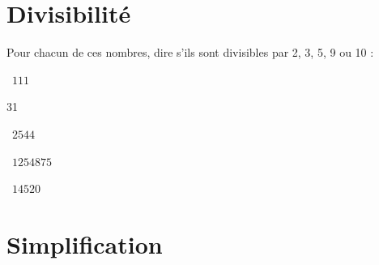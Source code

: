 	
	\section{Divisibilité}
	
	Pour chacun de ces nombres, dire s'ils sont divisibles par 2, 3, 5, 9 ou 10 :
	\begin{questions}
		
	
		\question[2]  $\num{111}$
		\fillwithdottedlines{1.5cm}
		\begin{solution}
			31
		\end{solution}	 
		
		\question[2]  $\num{2544}$
		\fillwithdottedlines{1.5cm}
		\begin{solution}
			
		\end{solution}
			
		
		\question[2]  $\num{1254875}$
		\fillwithdottedlines{1.5cm}
		\begin{solution}

		\end{solution}
		
		\question[2]  $\num{14520}$
		\fillwithdottedlines{1.5cm}
		\begin{solution}
			
		\end{solution}
	\end{questions}

\newpage

	\section{Simplification}
	
